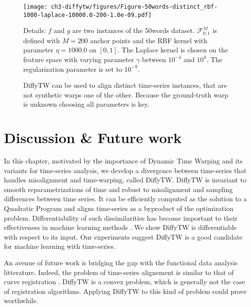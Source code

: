 \begin{figure}[ht!]
\begin{center}
\texttt{[image: ch3-diffytw/figures/Figure-50words-distinct\_rbf-1000-laplace-10000.0-200-1.0e-09.pdf]}
\end{center}
\caption[Aligning time-series instances.]{DiffyTW can be used to align distinct time-series instances, that are not synthetic warps one of the other. Because the ground-truth warp is unknown choosing all parameters is key.}
\small Details: $f$ and $g$ are two instances of the 50words dataset.
$\mathcal F_{0,1}^M$ is defined with $M=200$ anchor points and the RBF kernel with parameter $\eta=1000.0$ on $[0,1]$.
The Laplace kernel is chosen on the feature space with varying parameter $\gamma$ between $10^{-4}$ and $10^{4}$.
The regularization parameter is set to $10^{-9}$.
\label{fig:gamma-sensitivity-50words-distinct}
\end{figure}


\section{Discussion \& Future work}

In this chapter, motivated by the importance of Dynamic Time Warping and its variants for time-series analysis, we develop a divergence between time-series that handles misalignment and time-warping, called DiffyTW. DiffyTW is invariant to smooth reparametrizations of time and robust to misalignment and sampling differences between time series. It can be efficiently computed as the solution to a Quadratic Program and aligns time-series as a byproduct of the optimization problem. Differentiability of such dissimilarities has become important to their effectiveness in machine learning methods \citep{soft-dtw}. We show DiffyTW is differentiable with respect to its input. Our experiments suggest DiffyTW is a good candidate for machine learning with time-series.

An avenue of future work is bridging the gap with the functional data analysis litterature. Indeed, the problem of time-series alignement is similar to that of curve registration \cite{curve-moments}. DiffyTW is a convex problem, which is generally not the case of registration algorithms. Applying DiffyTW to this kind of problem could prove worthwhile.
